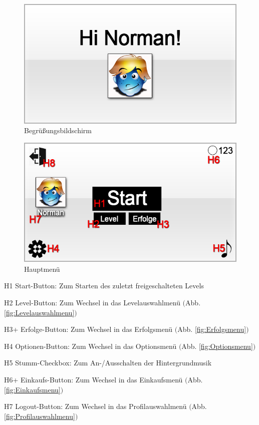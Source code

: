 
\begin{figure}[H]
\centering
\includegraphics[scale=0.55]{../gui/_jpeg_numeration/welcome.jpg}
\caption{Begrüßungsbildschirm}
\label{fig:Begrussungsbildschirm}
\end{figure}


\begin{figure}[H]
\centering
\includegraphics[scale=0.55]{../gui/_jpeg_numeration/main_manu.jpg}
\caption{Hauptmenü}
\label{fig:Hauptmenu}
\end{figure}
\begin{description*}
\item[H1] Start-Button: Zum Starten des zuletzt freigeschalteten Levels
\item[H2] Level-Button: Zum Wechsel in das Levelauswahlmenü $($Abb. \ref{fig:Levelauswahlmenu}$)$
\item[H3+] Erfolge-Button: Zum Wechsel in das Erfolgsmenü $($Abb. \ref{fig:Erfolgsmenu}$)$
\item[H4] Optionen-Button: Zum Wechsel in das Optionsmenü $($Abb. \ref{fig:Optionsmenu}$)$
\item[H5] Stumm-Checkbox: Zum An-/Ausschalten der Hintergrundmusik
\item[H6+] Einkaufs-Button: Zum Wechsel in das Einkaufsmenü $($Abb. \ref{fig:Einkaufsmenu}$)$
\item[H7] Logout-Button: Zum Wechsel in das Profilauswahlmenü $($Abb. \ref{fig:Profilauswahlmenu}$)$
\end{description*}

